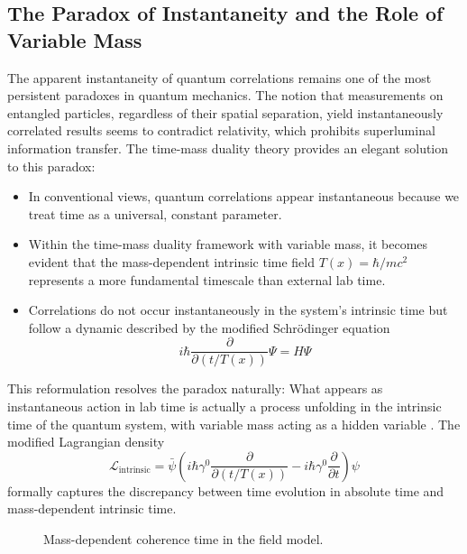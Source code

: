\documentclass[12pt,a4paper]{article}
\newcommand{\Tfield}{T(x)}
\begin{document}
	\subsection{The Paradox of Instantaneity and the Role of Variable Mass}
	The apparent instantaneity of quantum correlations remains one of the most persistent paradoxes in quantum mechanics. The notion that measurements on entangled particles, regardless of their spatial separation, yield instantaneously correlated results seems to contradict relativity, which prohibits superluminal information transfer.
	The time-mass duality theory provides an elegant solution to this paradox:
	\begin{itemize}
		\item In conventional views, quantum correlations appear instantaneous because we treat time as a universal, constant parameter.
		\item Within the time-mass duality framework with variable mass, it becomes evident that the mass-dependent intrinsic time field \(\Tfield = \hbar/mc^2\) represents a more fundamental timescale than external lab time.
		\item Correlations do not occur instantaneously in the system's intrinsic time but follow a dynamic described by the modified Schrödinger equation
		\begin{equation}
			i\hbar \frac{\partial}{\partial (t/\Tfield)}\Psi = \hat{H}\Psi
		\end{equation}
	\end{itemize}
	This reformulation resolves the paradox naturally: What appears as instantaneous action in lab time is actually a process unfolding in the intrinsic time of the quantum system, with variable mass acting as a hidden variable \cite{Pascher2024}\relax. The modified Lagrangian density
	\begin{equation}
		\mathcal{L}_\text{intrinsic} = \bar{\psi}\left(i\hbar\gamma^0 \frac{\partial}{\partial (t/\Tfield)} - i\hbar\gamma^0 \frac{\partial}{\partial t}\right)\psi
	\end{equation}
	formally captures the discrepancy between time evolution in absolute time and mass-dependent intrinsic time.
	
	\begin{figure}[h]
		\centering
		\caption{Mass-dependent coherence time in the field model.}
	\end{figure}
	
\end{document}
